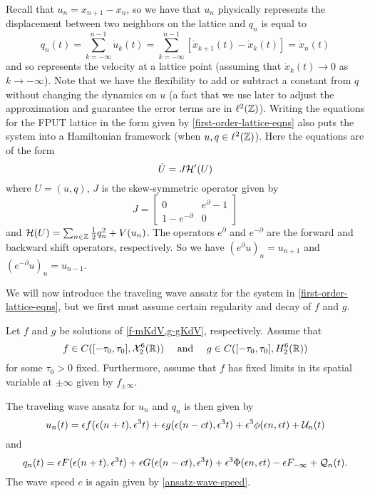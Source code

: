 Recall that \(u_{n} = x_{n+1} - x_n\), so we have that \(u_n\) physically represents the displacement between two neighbors on the lattice and \(q_n\) is equal to 
\begin{equation*}
	q_n(t) = \sum_{k=-\infty}^{n-1} \dot u_k(t) = \sum_{k=-\infty}^{n-1} [\dot x_{k+1}(t) - \dot x_k(t)] = \dot x_n(t)
\end{equation*}
and so represents the velocity at a lattice point (assuming that \(\dot x_k(t) \to 0\) as \(k\to-\infty\)). Note that we have the flexibility to add or subtract a constant from \(q\) without changing the dynamics on \(u\) (a fact that we use later to adjust the approximation and guarantee the error terms are in \(\ell^2(\mathbb{Z})\)). Writing the equations for the FPUT lattice in the form given by \cref{first-order-lattice-eqns} also puts the system into a Hamiltonian framework (when \(u, q\in\ell^2(\mathbb{Z})\)). Here the equations are of the form
\begin{equation*}
	\dot U = J \mathcal{H}'(U)
\end{equation*}
where \(U = (u,q)\), \(J\) is the skew-symmetric operator given by
\begin{equation*}
	J = \begin{bmatrix}
		0 & e^\partial - 1 \\ 1 - e^{-\partial} & 0
	\end{bmatrix}
\end{equation*}
and \(\mathcal{H}(U) = \sum_{n\in\mathbb{Z}} \frac 1 2 q_n^2 + V(u_n)\). The operators \(e^\partial\) and \(e^{-\partial}\) are the forward and backward shift operators, respectively. So we have \((e^\partial u)_n = u_{n+1}\) and \((e^{-\partial}u)_n = u_{n-1}\).

We will now introduce the traveling wave ansatz for the system in \cref{first-order-lattice-eqns}, but we first must assume certain regularity and decay of \(f\) and \(g\).
\begin{assum}\label{assumption-1}
	Let \(f\) and \(g\) be solutions of \cref{f-mKdV,g-gKdV}, respectively. Assume that \[f\in C([-\tau_0, \tau_0], \mathcal{X}_2^6(\mathbb{R})) \quad \text{ and } \quad g\in C([-\tau_0,\tau_0],H_2^6(\mathbb{R}))\] for some \(\tau_0>0\) fixed. Furthermore, assume that \(f\) has fixed limits in its spatial variable at \(\pm \infty\) given by \(f_{\pm \infty}\).
\end{assum}

The traveling wave ansatz for \(u_n\) and \(q_n\) is then given by
\begin{equation}\label{u-ansatz}
	u_n(t) = \epsilon f(\epsilon(n+t), \epsilon^3t) + \epsilon g(\epsilon(n-ct), \epsilon^3 t) + \epsilon^3 \phi(\epsilon n , \epsilon t) + \mathcal{U}_n(t)
\end{equation}
and 
\begin{equation}\label{q-ansatz}
	q_n(t) = \epsilon F(\epsilon(n+t), \epsilon^3 t) + \epsilon G(\epsilon(n-ct), \epsilon^3 t) + \epsilon^3 \Phi(\epsilon n, \epsilon t) - \epsilon F_{-\infty} + \mathcal{Q}_n(t).
\end{equation}
The wave speed \(c\) is again given by \cref{ansatz-wave-speed}. 

